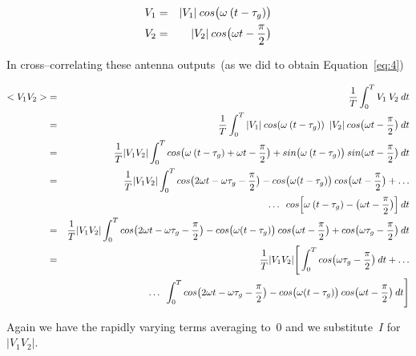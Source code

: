 \begin{eqnarray}
  \label{eq:14}
  \begin{aligned}
  V_1 &=& |V_1| \msp cos\big (\omega \msp (t - \tau _g)\big ) \\
  V_2 &=& |V_2| \msp cos\big (\omega t - \frac{\pi }{2}\big )
  \end{aligned}
\end{eqnarray}

In cross--correlating these antenna outputs~(as we did to obtain Equation~\eqref{eq:4})

\begin{eqnarray}
  \label{eq:15}
  <V_1V_2> &=& \frac{1}{T} \int _0^T V_1 \msp V_2 \msp dt \nonumber \\
           &=& \frac{1}{T}       \int _0^T |V_1| \msp cos(\omega \msp (t - \tau _g)) \enspace |V_2| \msp cos \big (\omega t - \frac{\pi }{2} \big ) \msp dt \nonumber \\
           &=& \frac{1}{T} |V_1V_2| \int _0^T cos  \big (\omega \msp (t - \tau _g) + \omega t - \frac{\pi }{2}\big) + sin \big (\omega \msp (t - \tau _g) \big) \msp sin(\omega t - \frac{\pi }{2} \big ) \msp dt \nonumber \\
           &=& \frac{1}{T} |V_1V_2| \int _0^T cos \big (2\omega t - \omega \tau _g - \frac{\pi }{2} \big ) - cos \big (\omega (t - \tau _g) \big) \msp cos \big (\omega t  -\frac{\pi }{2} \big ) + \dotso \nonumber \\
           && \dotso \enspace cos \Big [\omega \msp (t - \tau _g) - \big (\omega t - \frac{\pi }{2} \big ) \Big ] \msp dt \nonumber \\
           &=& \frac{1}{T} |V_1V_2| \int _0^T cos \big (2\omega t - \omega \tau _g - \frac{\pi }{2} \big ) - cos \big (\omega (t - \tau _g) \big) \msp cos \big (\omega t  -\frac{\pi }{2} \big ) + cos \big (\omega \tau _g - \frac{\pi }{2} \big ) \msp dt \nonumber \\
           &=& \frac{1}{T} |V_1V_2| \Bigg [\int _0^T cos \big (\omega \tau _g - \frac{\pi }{2} \big ) \msp dt + \dotso \nonumber \\
           && \dotso \enspace \int _0^T cos \big (2\omega t - \omega \tau _g - \frac{\pi }{2} \big ) - cos \big (\omega (t - \tau _g) \big) \msp cos \big (\omega t  -\frac{\pi }{2} \big ) \msp dt \Bigg ] \nonumber
\end{eqnarray}

Again we have the rapidly varying terms averaging to~0 and we substitute~$I$ for~$|V_1V_2|$.

